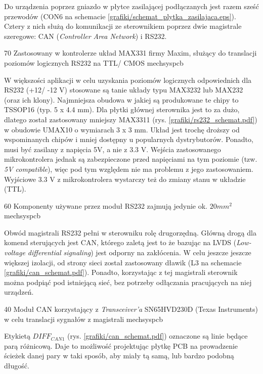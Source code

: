 Do urządzenia poprzez gniazdo w płytce zasilającej podłączanych jest razem sześć przewodów (CON6 na schemacie \ref{grafiki/schemat_plytka_zasilajaca.eps}). Cztery z nich służą do komunikacji ze sterownikiem poprzez dwie magistrale szeregowe: CAN ({\it Controller Area Network}) i RS232.

	{70}
	{Zastosowany w kontrolerze układ MAX331 firmy Maxim, służący do translacji poziomów logicznych RS232 na TTL/ CMOS}
	{mechsyspcb}

W większości aplikacji w celu uzyskania poziomów logicznych odpowiednich dla RS232 (+12/ -12 V) stosowane są tanie układy typu MAX3232 lub MAX232 (oraz ich klony). Najmniejsza obudowa w jakiej są produkowane te chipy to TSSOP16 (typ. 5 x 4.4 mm). Dla płytki głównej sterownika jest to za dużo, dlatego został zastosowany mniejszy   MAX3311 (rys. \ref{grafiki/rs232_schemat.pdf}) w obudowie UMAX10 o wymiarach 3 x 3 mm. Układ jest trochę droższy od wspominanych chipów i mniej dostępny u popularnych dystrybutorów. Ponadto, musi być zasilany z napięcia 5V, a nie z 3.3 V. Wejścia zastosowanego mikrokontrolera jednak są zabezpieczone przed napięciami na tym poziomie (tzw. {\it 5V compatible}), więc pod tym względem nie ma problemu z jego zastosowaniem. Wyjściowe 3.3 V z mikrokontrolera wystarczy też do zmiany stanu w układzie (TTL).

	{60}
	{Komponenty używane przez moduł RS232 zajmują jedynie ok. $ 20 mm^2 $}
	{mechsyspcb}

Obwód magistrali RS232 pełni w sterowniku rolę drugorzędną. Główną drogą dla komend sterujących jest CAN, którego zaletą jest to że bazując na LVDS ({\it Low-voltage differential signaling}) jest odporny na zakłócenia. W celu jeszcze jeszcze większej izolacji, od strony sieci został zastosowany dławik (L3 na schemacie \ref{grafiki/can_schemat.pdf}). Ponadto, korzystając z tej magistrali sterownik można podpiąć pod istniejącą sieć, bez potrzeby odłączania pracujących na niej urządzeń.

	{40}
	{Moduł CAN korzystający z {\it Transceiver'a} SN65HVD230D (Texas Instruments) w celu translacji sygnałów z magistrali}
	{mechsyspcb}
	
Etykietą $ DIFF_{CAN1} $ (rys. \ref{grafiki/can_schemat.pdf}) oznaczone są linie będące parą różnicową. Daje to możliwość projektując płytkę PCB na prowadzenie ścieżek danej pary w taki sposób, aby miały tą samą, lub bardzo podobną długość.

